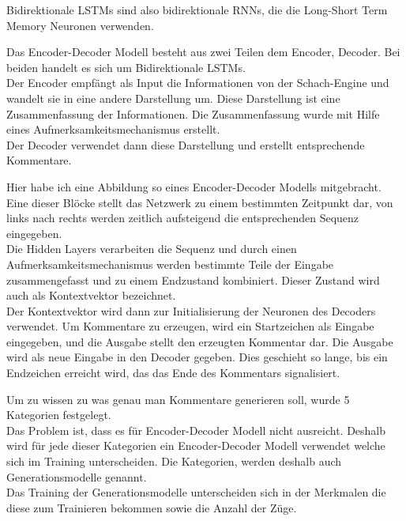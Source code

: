 Bidirektionale LSTMs sind also bidirektionale RNNs, die die Long-Short Term Memory Neuronen verwenden.

\newpage

Das Encoder-Decoder Modell besteht aus zwei Teilen dem Encoder, Decoder. Bei beiden handelt es sich um Bidirektionale LSTMs.\\

Der Encoder empfängt als Input die Informationen von der Schach-Engine und wandelt sie in eine andere Darstellung um. Diese Darstellung ist eine Zusammenfassung der Informationen. Die Zusammenfassung wurde mit Hilfe eines Aufmerksamkeitsmechanismus erstellt.\\

Der Decoder verwendet dann diese Darstellung und erstellt entsprechende Kommentare.

\newpage

Hier habe ich eine Abbildung so eines Encoder-Decoder Modells mitgebracht.\\

Eine dieser Blöcke stellt das Netzwerk zu einem bestimmten Zeitpunkt dar, von links nach rechts werden zeitlich aufsteigend die entsprechenden Sequenz eingegeben.\\

Die Hidden Layers verarbeiten die Sequenz und durch einen Aufmerksamkeitsmechanismus werden bestimmte Teile der Eingabe zusammengefasst und zu einem Endzustand kombiniert. Dieser Zustand wird auch als Kontextvektor bezeichnet.\\

Der Kontextvektor wird dann zur Initialisierung der Neuronen des Decoders verwendet. Um Kommentare zu erzeugen, wird ein Startzeichen als Eingabe eingegeben, und die Ausgabe stellt den erzeugten Kommentar dar. Die Ausgabe wird als neue Eingabe in den Decoder gegeben. Dies geschieht so lange, bis ein Endzeichen erreicht wird, das das Ende des Kommentars signalisiert.

\newpage

Um zu wissen zu was genau man Kommentare generieren soll, wurde 5 Kategorien festgelegt.\\

Das Problem ist, dass es für Encoder-Decoder Modell nicht ausreicht. Deshalb wird für jede dieser Kategorien ein Encoder-Decoder Modell verwendet welche sich im Training unterscheiden. Die Kategorien, werden deshalb auch Generationsmodelle genannt.\\

Das Training der Generationsmodelle unterscheiden sich in der Merkmalen die diese zum Trainieren bekommen sowie die Anzahl der Züge.

